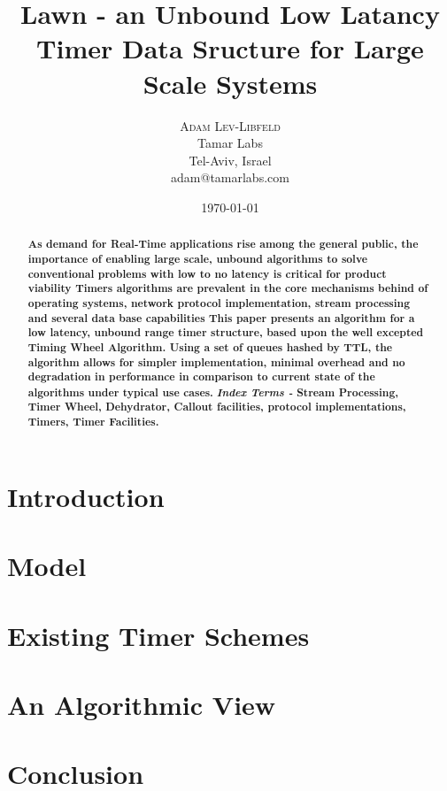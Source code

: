 \documentclass[twocolumn,a4paper]{article}
\title{Lawn - an Unbound Low Latancy Timer Data Sructure for Large Scale Systems}
\author{
	\textsc{Adam Lev-Libfeld} \\[1ex]
	\normalsize Tamar Labs \\
	\normalsize Tel-Aviv, Israel \\
	\normalsize{adam@tamarlabs.com}
}
\date{\today}
\begin{document}
\maketitle

\begin{abstract}
\textbf{\noindent As demand for Real-Time applications rise among 
the general public, the importance of enabling large scale, unbound algorithms to solve conventional problems with low to no latency is critical for product viability Timers algorithms are prevalent in the core mechanisms behind of operating systems, network protocol implementation, stream processing and several data base capabilities This paper presents an algorithm for a low latency, unbound range timer structure, based upon the well excepted Timing Wheel\cite{TW} Algorithm. Using a set of queues hashed by TTL, the algorithm allows for simpler implementation, minimal overhead and no degradation in performance in comparison to current state of the algorithms under typical use cases.}
\linebreak \linebreak
\textbf{\textit{Index Terms -} Stream Processing, Timer Wheel, Dehydrator, Callout facilities, protocol implementations, Timers, Timer Facilities.}
\end{abstract}


\section{Introduction}

\section{Model}

\section{Existing Timer Schemes}

\section{An Algorithmic View}

\section{Conclusion}



\end{document}
